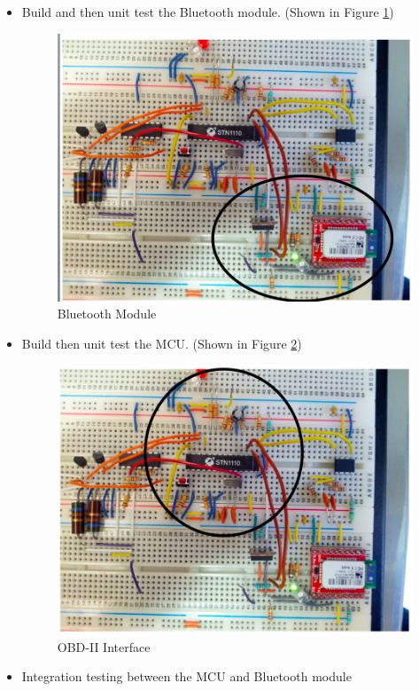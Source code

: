 \documentclass[12pt,letterpaper]{article}
\begin{document}
\begin{itemize}
\item Build and then unit test the Bluetooth module. (Shown in Figure \ref{fig:btinterface})
\begin{figure}[H]
\centering
\includegraphics[page=1, totalheight=7cm]{images/btinterface.png}
\caption{Bluetooth Module}
\label{fig:btinterface}
\end{figure}

\item Build then unit test the MCU. (Shown in Figure \ref{fig:odbinterface})
\begin{figure}[H]
\centering
\includegraphics[page=1, totalheight=7cm]{images/obdiiinterface.png}
\caption{OBD-II Interface}
\label{fig:odbinterface}
\end{figure}

\item Integration testing between the MCU and Bluetooth module


\end{itemize}
\end{document}
